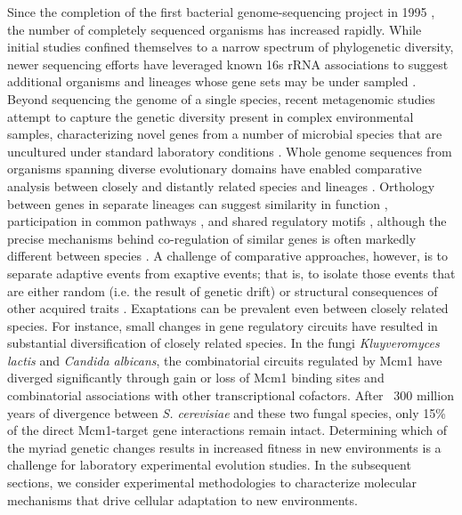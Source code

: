 Since the completion of the first bacterial genome-sequencing project in 1995 \cite{fleischmann_whole-genome_1995}, the number of completely sequenced organisms has increased rapidly.  While initial studies confined themselves to a narrow spectrum of phylogenetic diversity, newer sequencing efforts have leveraged known 16s rRNA associations to suggest additional organisms and lineages whose gene sets may be under sampled \cite{wu_identification_2009}. Beyond sequencing the genome of a single species, recent metagenomic studies attempt to capture the genetic diversity present in complex environmental samples, characterizing novel genes from a number of microbial species that are uncultured under standard laboratory conditions \cite{handelsman_metagenomics:_2004,streit_metagenomics_2004}. Whole genome sequences from organisms spanning diverse evolutionary domains have enabled comparative analysis between closely \cite{edwards_co-operative_2002} and distantly related species and lineages \cite{koonin_structure_2002,makarova_hicab_2006}. Orthology between genes in separate lineages can suggest similarity in function \cite{tatusov_cog_2000}, participation in common pathways \cite{kanehisa_kegg:_2000}, and shared regulatory motifs \cite{kellis_sequencing_2003}, although the precise mechanisms behind co-regulation of similar genes is often markedly different between species \cite{wapinski_gene_2010}. A challenge of comparative approaches, however, is to separate adaptive events from exaptive events; that is, to isolate those events that are either random (i.e. the result of genetic drift) or structural consequences of other acquired traits \cite{gould_spandrels_1979}. Exaptations can be prevalent even between closely related species.  For instance, small changes in gene regulatory circuits have resulted in substantial diversification of closely related species.  In the fungi \textit{Kluyveromyces lactis} and \textit{Candida albicans}, the combinatorial circuits regulated by Mcm1 have diverged significantly \cite{tuch_evolution_2008}  through gain or loss of Mcm1 binding sites and combinatorial associations with other transcriptional cofactors. After ~300 million years of divergence between \textit{S. cerevisiae} and these two fungal species, only 15\% of the direct Mcm1-target gene interactions remain intact.  Determining which of the myriad genetic changes results in increased fitness in new environments is a challenge for laboratory experimental evolution studies. In the subsequent sections, we consider experimental methodologies to characterize molecular mechanisms that drive cellular adaptation to new environments. 

